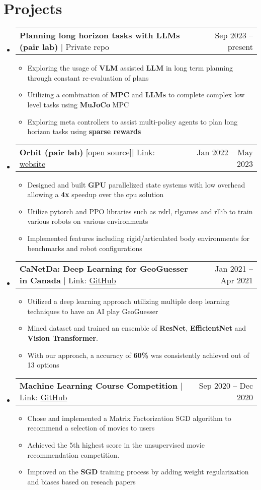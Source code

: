 \documentclass[letterpaper,11pt]{article}
\makeatletter
\newcommand{\resumeItem}[1]{
  \item\small{
    {#1 \vspace{0pt}}
  }
}
\newcommand{\resumeProjectHeading}[2]{
    \item
    \begin{tabular*}{0.97\textwidth}{l@{\extracolsep{\fill}}r}
      \small#1 & #2 \\
    \end{tabular*}\vspace{-5pt}
}
\newcommand{\resumeSubHeadingListStart}{\begin{itemize}[leftmargin=0.15in, label={}]}
\newcommand{\resumeSubHeadingListEnd}{\end{itemize}}
\newcommand{\resumeItemListStart}{\begin{itemize}}
\newcommand{\resumeItemListEnd}{\end{itemize}\vspace{-7pt}}
\makeatother
\begin{document}
\section{Projects}
    \resumeSubHeadingListStart
      \resumeProjectHeading
        {\textbf{Planning long horizon tasks with LLMs (pair lab)} $|$ Private repo}{Sep 2023 -- present}
        \resumeItemListStart
          \resumeItem{Exploring the usage of \textbf{VLM} assisted \textbf{LLM} in long term planning through constant re-evaluation of plans}
          \resumeItem{Utilizing a combination of \textbf{MPC} and \textbf{LLMs} to complete complex low level tasks using \textbf{MuJoCo} MPC}
          \resumeItem{Exploring meta controllers to assist multi-policy agents to plan long horizon tasks using \textbf{sparse rewards}}
        \resumeItemListEnd
      \resumeProjectHeading
        {\textbf{Orbit (pair lab)} [open source]$|$ Link: \href{https://isaac-orbit.github.io/}{website}}{Jan 2022 -- May 2023}
        \resumeItemListStart
          \resumeItem{Designed and built \textbf{GPU} parallelized state systems with low overhead allowing a \textbf{4x} speedup over the cpu solution}
          \resumeItem{Utilize pytorch and PPO libraries such as rslrl, rlgames and rllib to train various robots on various environments}
          \resumeItem{Implemented features including rigid/articulated body environments for benchmarks and robot configurations}
        \resumeItemListEnd
      \resumeProjectHeading
          {\textbf{CaNetDa: Deep Learning for GeoGuesser in Canada} $|$ Link: \href{https://github.com/st-tran/CSC413-Project}{GitHub}}{Jan 2021 -- Apr 2021}
          \resumeItemListStart
            \resumeItem{Utilized a deep learning approach utilizing multiple deep learning techniques to have an AI play GeoGuesser}
            \resumeItem{Mined dataset and trained an ensemble of \textbf{ResNet}, \textbf{EfficientNet} and \textbf{Vision Transformer}.}
            \resumeItem{With our approach, a accuracy of \textbf{60\%} was consistently achieved out of 13 options}
          \resumeItemListEnd
      \resumeProjectHeading
          {\textbf{Machine Learning Course Competition} $|$ Link: \href{https://github.com/JaLnYn/csc311_final_project/tree/main/project/starter_code}{GitHub}}{Sep 2020 -- Dec 2020}
          \resumeItemListStart
            \resumeItem{Chose and implemented a Matrix Factorization SGD algorithm to recommend a selection of movies to users}
            \resumeItem{Achieved the 5th highest score in the unsupervised movie recommendation competition.}
            \resumeItem{Improved on the \textbf{SGD} training process by adding weight regularization and biases based on reseach papers}
          \resumeItemListEnd
    \resumeSubHeadingListEnd
    
\end{document}
